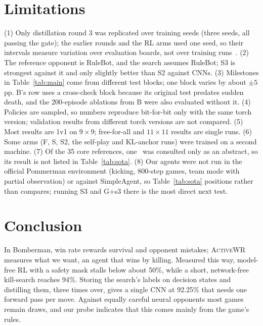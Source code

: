 \documentclass[conference]{IEEEtran}
\newcommand{\awr}{\textsc{ActiveWR}}
\newcommand{\pp}{\,pp}
\begin{document}
\section{Limitations}
(1) Only distillation round 3 was replicated over training seeds (three seeds, all passing the gate); the earlier rounds and the RL arms used one seed, so their intervals measure variation over evaluation boards, not over training runs~\cite{henderson2018matters,agarwal2021precipice}. (2) The reference opponent is RuleBot, and the search assumes RuleBot; S3 is strongest against it and only slightly better than S2 against CNNs. (3) Milestones in Table~\ref{tab:main} come from different test blocks; one block varies by about $\pm5$\pp{}. B's row uses a cross-check block because its original test predates sudden death, and the 200-episode ablations from B were also evaluated without it. (4) Policies are sampled, so numbers reproduce bit-for-bit only with the same torch version; validation results from different torch versions are not compared. (5) Most results are 1v1 on $9\times9$; free-for-all and $11\times11$ results are single runs. (6) Some arms (F, S, S2, the self-play and KL-anchor runs) were trained on a second machine. (7) Of the 35 core references, one~\cite{goulart2019} was consulted only as an abstract, so its result is not listed in Table~\ref{tab:sota}. (8) Our agents were not run in the official Pommerman environment (kicking, 800-step games, team mode with partial observation) or against SimpleAgent, so Table~\ref{tab:sota} positions rather than compares; running S3 and G+s3 there is the most direct next test.

\section{Conclusion}
In Bomberman, win rate rewards survival and opponent mistakes; \awr{} measures what we want, an agent that wins by killing. Measured this way, model-free RL with a safety mask stalls below about 50\%, while a short, network-free kill-search reaches 94\%. Storing the search's labels on decision states and distilling them, three times over, gives a single CNN at 92.25\% that needs one forward pass per move. Against equally careful neural opponents most games remain draws, and our probe indicates that this comes mainly from the game's rules.

\end{document}
